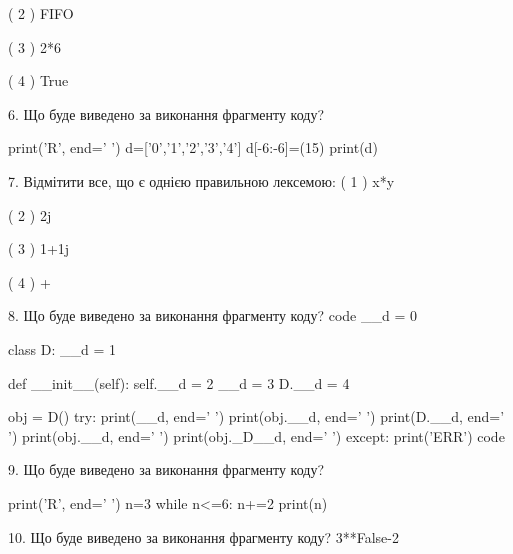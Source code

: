 \documentclass[11pt]{article}
\begin{document}
( 2 ) FIFO

( 3 ) 2*6

( 4 ) True

6. Що буде виведено за виконання фрагменту коду?

print('R', end=' ')
d=['0','1','2','3','4']
d[-6:-6]=(15)
print(d)


7. %
Відмітити все, що є однією правильною лексемою:
( 1 ) x*y

( 2 ) 2j

( 3 ) 1+1j

( 4 ) +

8. Що буде виведено за виконання фрагменту коду?
code
__d = 0

class D:
    __d = 1
    
    def __init__(self):
        self.__d = 2
        __d = 3
        D.__d = 4

obj = D()
try:
    print(__d, end=' ')
    print(obj.__d, end=' ')
    print(D.__d, end=' ')
    print(obj.__d, end=' ')
    print(obj._D__d, end=' ')
except:
    print('ERR')
code

9. Що буде виведено за виконання фрагменту коду?

print('R', end=' ')
n=3
while n<=6:
    n+=2
print(n)


10. Що буде виведено за виконання фрагменту коду?
3**False-2










\newpage
\end{document}
